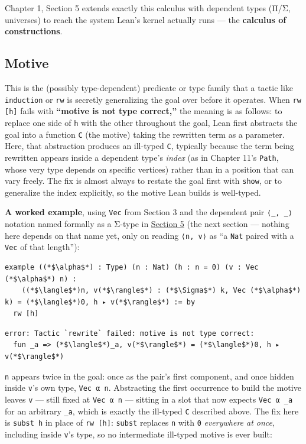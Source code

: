 Chapter 1, Section 5 extends exactly this calculus with dependent types (Π/Σ, universes) to reach the system Lean's kernel actually runs --- the \textbf{calculus of constructions}.

\subsection{Motive}\label{sec:01-basics:04-terminology:6}

This is the (possibly type-dependent) predicate or type family that a tactic like \texttt{induction} or \texttt{rw} is secretly generalizing the goal over before it operates. When \texttt{rw [h]} fails with \textbf{``motive is not type correct,''} the meaning is as follows: to replace one side of \texttt{h} with the other throughout the goal, Lean first abstracts the goal into a function \texttt{C} (the motive) taking the rewritten term as a parameter. Here, that abstraction produces an ill-typed \texttt{C}, typically because the term being rewritten appears inside a dependent type's \emph{index} (as in Chapter 11's \texttt{Path}, whose very type depends on specific vertices) rather than in a position that can vary freely. The fix is almost always to restate the goal first with \texttt{show}, or to generalize the index explicitly, so the motive Lean builds is well-typed.

\textbf{A worked example}, using \texttt{Vec} from Section 3 and the dependent pair \texttt{⟨\_\allowbreak{}, \_\allowbreak{}⟩} notation named formally as a Σ-type in \hyperref[sec:01-basics:05-pi-sigma-and-coc:1]{Section 5} (the next section --- nothing here depends on that name yet, only on reading \texttt{⟨n, v⟩} as ``a \texttt{Nat} paired with a \texttt{Vec} of that length''):

\begin{lstlisting}
example ((*$\alpha$*) : Type) (n : Nat) (h : n = 0) (v : Vec (*$\alpha$*) n) :
    ((*$\langle$*)n, v(*$\rangle$*) : (*$\Sigma$*) k, Vec (*$\alpha$*) k) = (*$\langle$*)0, h ▸ v(*$\rangle$*) := by
  rw [h]
\end{lstlisting}

\begin{lstlisting}
error: Tactic `rewrite` failed: motive is not type correct:
  fun _a => (*$\langle$*)_a, v(*$\rangle$*) = (*$\langle$*)0, h ▸ v(*$\rangle$*)
\end{lstlisting}

\texttt{n} appears twice in the goal: once as the pair's first component, and once hidden inside \texttt{v}'s own type, \texttt{Vec α n}. Abstracting the first occurrence to build the motive leaves \texttt{v} --- still fixed at \texttt{Vec α n} --- sitting in a slot that now expects \texttt{Vec α \_\allowbreak{}a} for an arbitrary \texttt{\_\allowbreak{}a}, which is exactly the ill-typed \texttt{C} described above. The fix here is \texttt{subst h} in place of \texttt{rw [h]}: \texttt{subst} replaces \texttt{n} with \texttt{0} \emph{everywhere at once}, including inside \texttt{v}'s type, so no intermediate ill-typed motive is ever built:

